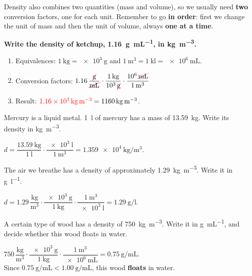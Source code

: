 Density also combines two quantities (mass and volume), so we usually need \textbf{two} conversion factors, one for each unit. Remember to go \textbf{in order}: first we change the unit of mass and then the unit of volume, always \textbf{one at a time}.

\begin{example}
    \textbf{Write the density of ketchup, \qty{1.16}{\g\per\mL}, in \unit{\kg\per\cubic\metre}.}
    \begin{enumerate}[label=\numberballmDarkTeal]
        \item Equivalences: \(\qty{1}{\kg} = \qty{e3}{\g}\) and \(\qty{1}{\cubic\metre} = \qty{1}{\kilo\litre} = \qty{e6}{\mL}\).
        \item Conversion factors:
        \(
            \num{1.16}\,\dfrac{\cancelunit{\g}}{\cancelunit{\mL}} \cdot \dfrac{\qty{1}{\kg}}{\num{e3}\,\cancelunit{\g}} \cdot \dfrac{\num{e6}\,\cancelunit{\mL}}{\qty{1}{\cubic\m}}
        \)
        \item Result: \(\textcolor{red}{\qty{1.16e3}{\kg\per\cubic\metre}} = \qty{1160}{\kg\per\cubic\m}\).
    \end{enumerate}
\end{example}

\begin{exercise}
    Mercury is a liquid metal. \qty{1}{\litre} of mercury has a mass of \qty{13.59}{\kg}. Write its density in \unit{\kg\per\cubic\metre}.
    \begin{solu}
        \(d = \dfrac{\qty{13.59}{\kg}}{\qty{1}{\litre}} \cdot \dfrac{\qty{e3}{\litre}}{\qty{1}{\cubic\m}} = \qty{1.359e4}{\kg\per\cubic\metre}\).
    \end{solu}
\end{exercise}

\begin{exercise}
    The air we breathe has a density of approximately \qty{1.29}{\kg\per\cubic\metre}. Write it in \unit{\g\per\litre}.
    \begin{solu}
        \(d = \num{1.29}\,\dfrac{\unit{\kg}}{\unit{\cubic\m}} \cdot \dfrac{\qty{e3}{\g}}{\qty{1}{\kg}} \cdot \dfrac{\qty{1}{\cubic\m}}{\qty{e3}{\litre}} = \qty{1.29}{\g\per\litre}\).
    \end{solu}
\end{exercise}

\begin{exercise}
    A certain type of wood has a density of \qty{750}{\kg\per\cubic\metre}. Write it in \unit{\g\per\mL}, and decide whether this wood floats in water.
    \begin{solu}
        \(\num{750}\,\dfrac{\unit{\kg}}{\unit{\cubic\m}} \cdot \dfrac{\qty{e3}{\g}}{\qty{1}{\kg}} \cdot \dfrac{\qty{1}{\cubic\m}}{\qty{e6}{\mL}} = \qty{0.75}{\g\per\mL}\). \\
        Since \(\qty{0.75}{\g\per\mL} < \qty{1.00}{\g\per\mL}\), this wood \textbf{floats} in water.
    \end{solu}
\end{exercise}

